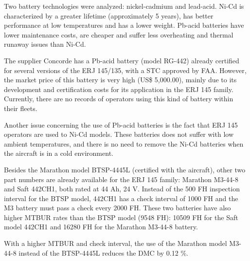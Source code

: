 Two battery technologies were analyzed: nickel-cadmium and lead-acid. Ni-Cd is characterized by a greater lifetime (approximately 5 years), has better performance at low temperatures and has a lower weight. Pb-acid batteries have lower maintenance costs, are cheaper and suffer less overheating and thermal runaway issues than Ni-Cd.

The supplier Concorde has a Pb-acid battery (model RG-442) already certified for several versions of the ERJ 145/135, with a STC approved by FAA. However, the market price of this battery is very high (US\$ 5,000.00), mainly due to its development and certification costs for its application in the ERJ 145 family. Currently, there are no records of operators using this kind of battery within their fleets.

Another issue concerning the use of Pb-acid batteries is the fact that ERJ 145 operators are used to Ni-Cd models. These batteries does not suffer with low ambient temperatures, and there is no need to remove the Ni-Cd batteries when the aircraft is in a cold environment.

Besides the Marathon model BTSP-4445L (certified with the aircraft), other two part numbers are already available for the ERJ 145 family: Marathon M3-44-8 and Saft 442CH1, both rated at 44 Ah, 24 V. Instead of the 500 FH inspection interval for the BTSP model, 442CH1 has a check interval of 1000 FH and the M3 battery must pass a check every 2000 FH. These two batteries have also higher MTBUR rates than the BTSP model (9548 FH): 10509 FH for the Saft model 442CH1 and 16280 FH for the Marathon M3-44-8 battery.

With a higher MTBUR and check interval, the use of the Marathon model M3-44-8 instead of the BTSP-4445L reduces the DMC by 0.12 \%.

